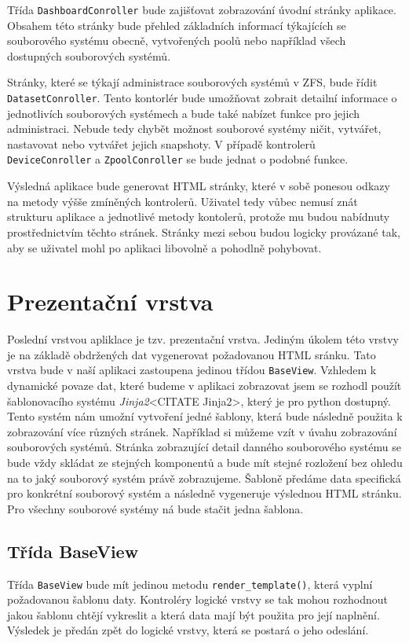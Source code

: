     Třída \verb|DashboardConroller| bude zajišťovat zobrazování úvodní stránky aplikace. Obsahem této stránky bude přehled základních informací týkajících se souborového systému obecně, vytvořených poolů nebo například všech dostupných souborových systémů.

    Stránky, které se týkají administrace souborových systémů v ZFS, bude řídit \verb|DatasetConroller|. Tento kontorlér bude umožňovat zobrait detailní informace o jednotlivích souborových systémech a bude také nabízet funkce pro jejich administraci. Nebude tedy chybět možnost souborové systémy ničit, vytvářet, nastavovat nebo vytvářet jejich snapshoty.
    V případě kontrolerů \verb|DeviceConroller| a \verb|ZpoolConroller| se bude jednat o podobné funkce.

    Výsledná aplikace bude generovat HTML stránky, které v sobě ponesou odkazy na metody výšše zmíněných kontrolerů. Uživatel tedy vůbec nemusí znát strukturu aplikace a jednotlivé metody kontolerů, protože mu budou nabídnuty prostřednictvím těchto stránek. Stránky mezi sebou budou logicky provázané tak, aby se uživatel mohl po aplikaci libovolně a pohodlně pohybovat.

\section{Prezentační vrstva}
Poslední vrstvou apliklace je tzv. prezentační vrstva. Jediným úkolem této vrstvy je na základě obdržených dat vygenerovat požadovanou HTML sránku. Tato vrstva bude v naší aplikaci zastoupena jedinou třídou \verb|BaseView|. Vzhledem k dynamické povaze dat, které budeme v aplikaci zobrazovat jsem se rozhodl použít šablonovacího systému \emph{Jinja2}<CITATE Jinja2>, který je pro python dostupný. Tento systém nám umožní vytvoření jedné šablony, která bude následně použita k zobrazování více různých stránek. Například si můžeme vzít v úvahu zobrazování souborových systémů. Stránka zobrazující detail danného souborového systému se bude vždy skládat ze stejných komponentů a bude mít stejné rozložení bez ohledu na to jaký souborový systém právě zobrazujeme. Šabloně předáme data specifická pro konkrétní souborový systém a následně vygeneruje výslednou HTML stránku. Pro všechny souborové systémy ná bude stačit jedna šablona.
    \subsection{Třída BaseView}
    Třída \verb|BaseView| bude mít jedinou metodu \verb|render_template()|, která vyplní požadovanou šablonu daty. Kontroléry logické vrstvy se tak mohou rozhodnout jakou šablonu chtějí vykreslit a která data mají být použita pro její naplnění. Výsledek je předán zpět do logické vrstvy, která se postará o jeho odeslání.
